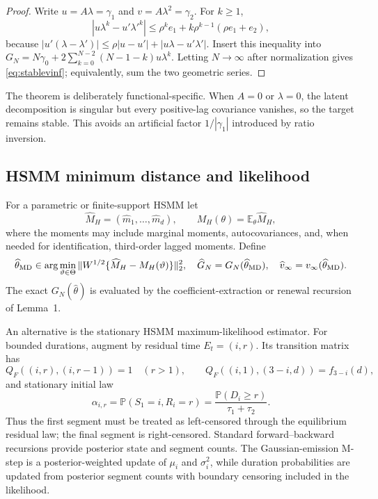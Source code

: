 \documentclass[11pt]{article}
\theoremstyle{definition}
\theoremstyle{remark}
\newcommand{\E}{\mathbb E}
\newcommand{\Pp}{\mathbb P}
\begin{document}
\begin{proof}
Write $u=A\lambda=\gamma_1$ and $v=A\lambda^2=\gamma_2$.  For $k\ge1$,
\[
 |u\lambda^k-u'{\lambda'}^k|
 \le \rho^k e_1+k\rho^{k-1}(\rho e_1+e_2),
\]
because
$|u'(\lambda-\lambda')|
\le\rho|u-u'|+|u\lambda-u'\lambda'|$.
Insert this inequality into
$G_N=N\gamma_0+2\sum_{k=0}^{N-2}(N-1-k)u\lambda^k$.
Letting $N\to\infty$ after normalization gives
\eqref{eq:stablevinf}; equivalently, sum the two geometric series.
\end{proof}

The theorem is deliberately functional-specific.  When $A=0$ or
$\lambda=0$, the latent decomposition is singular but every positive-lag
covariance vanishes, so the target remains stable.  This avoids an artificial
factor $1/|\gamma_1|$ introduced by ratio inversion.

\subsection{HSMM minimum distance and likelihood}

For a parametric or finite-support HSMM let
\[
 \widehat M_H=(\widehat m_1,\ldots,\widehat m_d),
 \qquad M_H(\theta)=\E_\theta\widehat M_H,
\]
where the moments may include marginal moments, autocovariances, and, when
needed for identification, third-order lagged moments.  Define
\begin{equation}
 \widehat\theta_{\rm MD}\in
 \arg\min_{\vartheta\in\Theta}
 \|W^{1/2}\{\widehat M_H-M_H(\vartheta)\}\|_2^2,
 \quad
 \widehat G_N=G_N(\widehat\theta_{\rm MD}),
 \quad
 \widehat v_\infty=v_\infty(\widehat\theta_{\rm MD}).
 \label{eq:mdhsmm}
\end{equation}
The exact $G_N(\widehat\theta)$ is evaluated by the coefficient-extraction or
renewal recursion of Lemma~1.

An alternative is the stationary HSMM maximum-likelihood estimator.  For
bounded durations, augment by residual time $E_t=(i,r)$.  Its transition
matrix has
\[
 Q_F((i,r),(i,r-1))=1\quad(r>1),
 \qquad
 Q_F((i,1),(3-i,d))=f_{3-i}(d),
\]
and stationary initial law
\begin{equation}
 \alpha_{i,r}=\Pp(S_1=i,R_i=r)
 =\frac{\Pp(D_i\ge r)}{\tau_1+\tau_2}.
 \label{eq:auginitial}
\end{equation}
Thus the first segment must be treated as left-censored through the
equilibrium residual law; the final segment is right-censored.  Standard
forward--backward recursions provide posterior state and segment counts.  The
Gaussian-emission M-step is a posterior-weighted update of $\mu_i$ and
$\sigma_i^2$, while duration probabilities are updated from posterior segment
counts with boundary censoring included in the likelihood.
\end{document}

